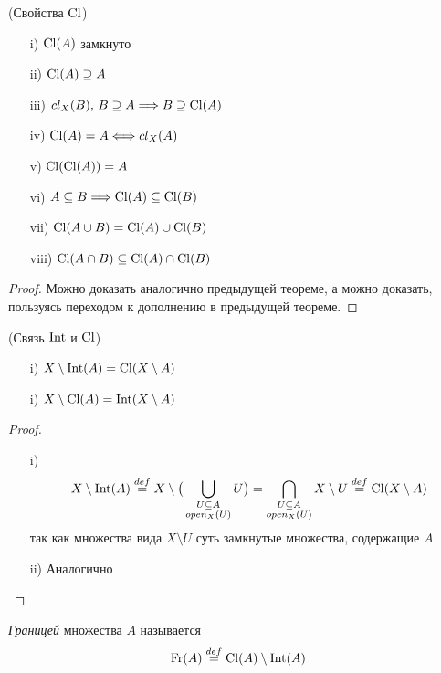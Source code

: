 \begin{theorem}(Свойства $\operatorname{Cl}$)
    \enewline
    \begin{itemize}
        \item[i)] $\operatorname{Cl}(A)$ замкнуто
        \item[ii)] $\operatorname{Cl}(A) \supseteq A$
        \item[iii)] $cl_X(B),\, B \supseteq A \Longrightarrow B \supseteq \operatorname{Cl}(A)$
        \item[iv)] $\operatorname{Cl}(A) = A \Longleftrightarrow cl_X(A)$
        \item[v)] $\operatorname{Cl}(\operatorname{Cl}(A)) = A$
        \item[vi)] $A \subseteq B \Longrightarrow \operatorname{Cl}(A) \subseteq \operatorname{Cl}(B)$
        \item[vii)] $\operatorname{Cl}(A \cup B) = \operatorname{Cl}(A) \cup \operatorname{Cl}(B)$
        \item[viii)] $\operatorname{Cl}(A \cap B) \subseteq \operatorname{Cl}(A) \cap \operatorname{Cl}(B)$
    \end{itemize}
\end{theorem}
\begin{proof}
    Можно доказать аналогично предыдущей теореме, а можно доказать, пользуясь
    переходом к дополнению в предыдущей теореме.
\end{proof}

\begin{theorem}(Связь $\operatorname{Int}$ и $\operatorname{Cl}$)
    \begin{itemize}
        \item[i)] $X \setminus \operatorname{Int}(A) = \operatorname{Cl}(X \setminus A)$
        \item[i)] $X \setminus \operatorname{Cl}(A) = \operatorname{Int}(X \setminus A)$
    \end{itemize}
\end{theorem}
\begin{proof}
    \enewline
    \begin{itemize}
        \item[i)] $$ X \setminus \operatorname{Int}(A) \overset{def}{\underset{}{=}} X \setminus
        \big( \bigcup_{\substack{U \subseteq A \\open_X(U)}}{U} \big) =
        \bigcap_{\substack{U \subseteq A \\open_X(U)}}{X \setminus U} \overset{def}{\underset{}{=}}
        \operatorname{Cl}(X \setminus A) $$
        так как множества вида $X \setminus U$ суть замкнутые множества,
        содержащие $A$
        \item[ii)] Аналогично
    \end{itemize}
\end{proof}

\begin{definition}
    \textit{Границей} множества $A$ называется
\[
    \operatorname{Fr}(A) \overset{def}{\underset{}{=}} \operatorname{Cl}(A) \setminus \operatorname{Int}(A)
\]
\end{definition}


